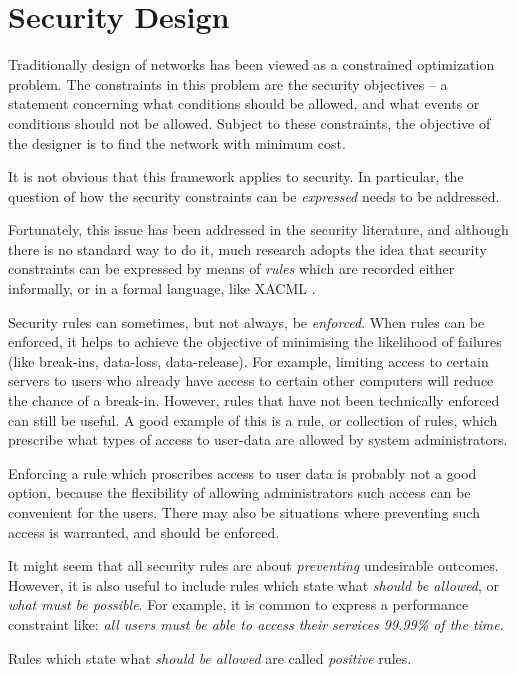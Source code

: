 \section{Security Design}

Traditionally design of networks has been viewed as a constrained optimization problem.
The constraints in this problem are the security objectives -- a statement concerning
what conditions should be allowed, and what events or conditions should not be allowed.
Subject to these constraints, the objective of the designer is to find the network
with minimum cost.

It is not obvious that this framework applies to security. In particular, the question of how the security constraints can be {\em expressed} needs to be addressed. 

Fortunately, this issue has been addressed in the security literature, and although there is no standard way to do it, much research adopts the idea that security constraints can be expressed by means of {\em rules} which are recorded either informally, or in a formal language, like XACML \cite{xacml10}.

Security rules can sometimes, but not always, be {\em enforced}. When rules can be enforced, it helps to achieve the objective of minimising the likelihood of failures (like break-ins, data-loss, data-release). For example, limiting access to certain servers to users who already have access to certain other computers will reduce the chance of a break-in. However, rules that have not been technically enforced can still be useful. A good example of this is a rule, or collection of rules, which prescribe what types of access to user-data are allowed by system administrators.

Enforcing a rule which proscribes access to user data is probably not a good option, because the flexibility of allowing administrators such access can be convenient for the users. There may also be situations where preventing such access is warranted, and should be enforced.

It might seem that all security rules are about {\em preventing} undesirable outcomes. However, it is also useful to include rules which state what {\em should be allowed}, or {\em what must be possible}. For example, it is common to express a performance constraint like: {\em all users must be able to access their services 99.99\% of the time}.

Rules which state what {\em should be allowed} are called {\em positive} rules.

